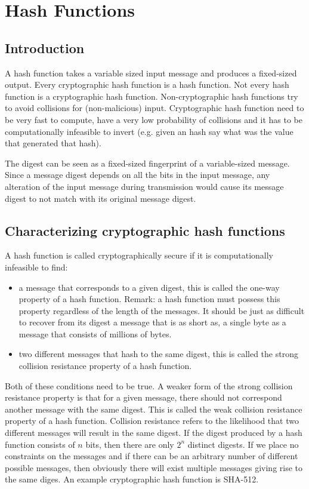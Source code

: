 \chapter{Hash Functions}

\section{Introduction}

A hash function takes a variable sized input message and produces a fixed-sized output. Every cryptographic hash function is a hash function. Not every hash function is a cryptographic hash function. Non-cryptographic hash functions try to avoid collisions for (non-malicious) input. Cryptographic hash function need to be very fast to compute, have a very low probability of collisions and it has to be computationally infeasible to invert (e.g. given an hash say what was the value that generated that hash).

The digest can be seen as a fixed-sized fingerprint of a variable-sized message. Since a message digest depends on all the bits in the input message, any alteration of the input message during transmission would cause its message digest to not match with its original message digest.

\section{Characterizing cryptographic hash functions}

A hash function is called cryptographically secure if it is computationally infeasible to find:
\begin{itemize}
	\item a message that corresponds to a given digest, this is called the one-way property of a hash function. Remark: a hash function must possess this property regardless of the length of the messages. It should be just as difficult to recover from its digest a message that is as short as, a single byte as a message that consists of millions of bytes.
	\item two different messages that hash to the same digest, this is called the strong collision resistance property of a hash function.
\end{itemize}

Both of these conditions need to be true. A weaker form of the strong collision resistance property is that for a given message, there should not correspond another message with the same digest. This is called the weak collision resistance property of a hash function. Collision resistance refers to the likelihood that two different messages will result in the same digest. If the digest produced by a hash function consists of $n$ bits, then there are only $2^n$ distinct digests. If we place no constraints on the messages and if there can be an arbitrary number of different possible messages, then obviously there will exist multiple messages giving rise to the same diges. An example cryptographic hash function is SHA-512.

